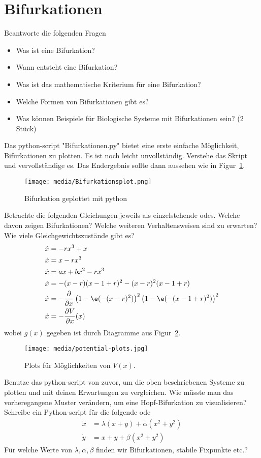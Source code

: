 \section{Bifurkationen}
Beantworte die folgenden Fragen
\begin{itemize}
    \item Was ist eine Bifurkation?
    \item Wann entsteht eine Bifurkation?
    \item Was ist das mathematische Kriterium für eine Bifurkation?
    \item Welche Formen von Bifurkationen gibt es?
    \item Was können Beispiele für Biologische Systeme mit Bifurkationen sein? (2 Stück)
\end{itemize}
%
%
Das python-script "Bifurkationen.py" bietet eine erste einfache Möglichkeit, Bifurkationen zu plotten.
Es ist noch leicht unvollständig.
Verstehe das Skript und vervollständige es.
Das Endergebnis sollte dann aussehen wie in Figur~\ref{fig:bifurcation-plot}.
\begin{figure}[!h]
    \centering
    \texttt{[image: media/Bifurkationsplot.png]}
    \caption{Bifurkation geplottet mit python}
    \label{fig:bifurcation-plot}
\end{figure}
%
%
Betrachte die folgenden Gleichungen jeweils als einzelstehende \acp{ode}. Welche davon zeigen Bifurkationen? Welche weiteren Verhaltensweisen sind zu erwarten? Wie viele Gleichgewichtszustände gibt es?
\begin{align}
    \dot{x} &= -rx^3+x\\
    \dot{x} &= x - rx^3\\
    \dot{x} &= ax + bx^2 - rx^3\\
    \dot{x} &= -(x-r)(x-1+r)^2 - (x-r)^2(x-1+r)\\
    \dot{x} &= -\frac{\partial}{\partial x}\left(1-\e(-(x-r)^2)\right)^2\left(1-\e(-(x-1+r)^2)\right)^2\\
    \dot{x} &= -\frac{\partial V}{\partial x}(x)
\end{align}
wobei $g(x)$ gegeben ist durch Diagramme aus Figur~\ref{fig:potential-plots}.
\begin{figure}[!h]
    \centering
    \texttt{[image: media/potential-plots.jpg]}
    \caption{Plots für Möglichkeiten von $V(x)$.}
    \label{fig:potential-plots}
\end{figure}
%
%
Benutze das python-script von zuvor, um die oben beschriebenen Systeme zu plotten und mit deinen Erwartungen zu vergleichen.
%
%
Wie müsste man das vorheregangene Muster verändern, um eine Hopf-Bifurkation zu visualisieren?
Schreibe ein Python-script für die folgende \ac{ode}
\begin{align}
    \dot{x} &= \lambda(x+y) + \alpha(x^2+y^2)\\
    \dot{y} &= x+y+\beta(x^2+y^2)
\end{align}
Für welche Werte von $\lambda,\alpha,\beta$ finden wir Bifurkationen, stabile Fixpunkte etc.?
%
%
